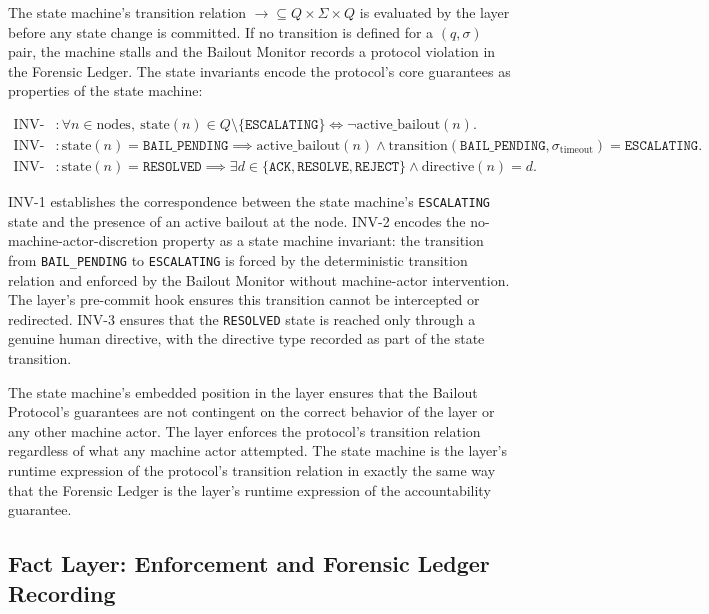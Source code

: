 The state machine's transition relation $\rightarrow \subseteq Q \times \Sigma \times Q$
is evaluated by the \fact{} layer before any state change is committed.  If
no transition is defined for a $(q, \sigma)$ pair, the machine stalls and the
Bailout Monitor records a protocol violation in the Forensic Ledger.  The state
invariants encode the protocol's core guarantees as properties of the state
machine:

\begin{align}
\text{INV-1}&: \forall n \in \text{nodes},\ \text{state}(n) \in Q \setminus \{\texttt{ESCALATING}\} \iff \neg\text{active\_bailout}(n). \tag{BP-INV-1} \\[6pt]
\text{INV-2}&: \text{state}(n) = \texttt{BAIL\_PENDING} \implies \text{active\_bailout}(n) \land \text{transition}(\texttt{BAIL\_PENDING}, \sigma_{\text{timeout}}) = \texttt{ESCALATING}. \tag{BP-INV-2} \\[6pt]
\text{INV-3}&: \text{state}(n) = \texttt{RESOLVED} \implies \exists d \in \{\texttt{ACK}, \texttt{RESOLVE}, \texttt{REJECT}\} \land \text{directive}(n) = d. \tag{BP-INV-3}
\end{align}

INV-1 establishes the correspondence between the state machine's
\texttt{ESCALATING} state and the presence of an active bailout at the node.
INV-2 encodes the no-machine-actor-discretion property as a state machine
invariant: the transition from \texttt{BAIL\_PENDING} to \texttt{ESCALATING} is
forced by the deterministic transition relation and enforced by the Bailout
Monitor without machine-actor intervention.  The \fact{} layer's pre-commit
hook ensures this transition cannot be intercepted or redirected.  INV-3
ensures that the \texttt{RESOLVED} state is reached only through a genuine
human directive, with the directive type recorded as part of the state
transition.

The state machine's embedded position in the \fact{} layer ensures that the
Bailout Protocol's guarantees are not contingent on the correct behavior of
the \bounds{} layer or any other machine actor.  The \fact{} layer enforces
the protocol's transition relation regardless of what any machine actor
attempted.  The state machine is the \fact{} layer's runtime expression of the
protocol's transition relation in exactly the same way that the Forensic
Ledger is the \fact{} layer's runtime expression of the accountability
guarantee.

\subsection{Fact Layer: Enforcement and Forensic Ledger Recording}
\label{sec:bailout-fact-layer}

